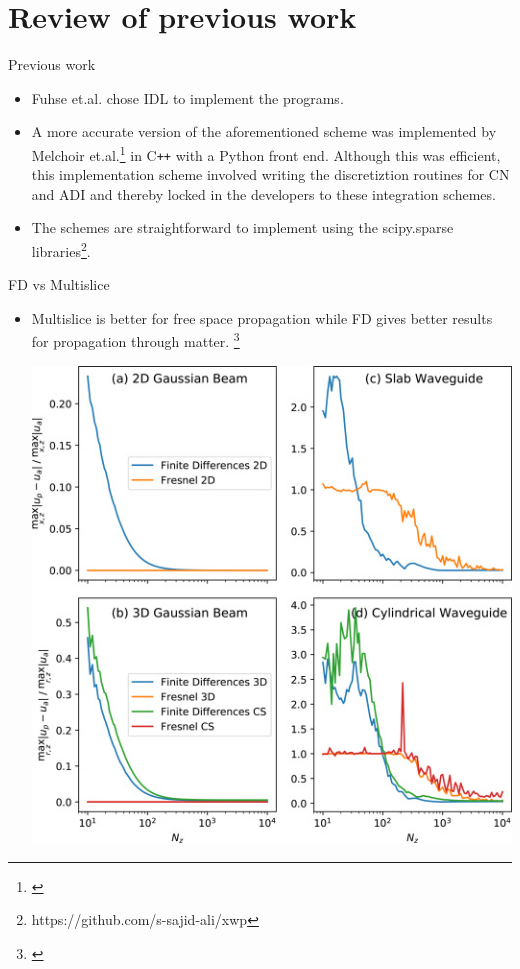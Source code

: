 \documentclass{beamer}
\begin{document}
\section{Review of previous work}
\begin{frame}{Previous work}
\begin{itemize}
	\item Fuhse et.al. chose IDL to implement the programs. 
	\item A more accurate version of the aforementioned scheme was implemented by Melchoir et.al.\footnote{\cite{Melchior17}} in C\texttt{++} with a Python front end. Although this was efficient, this implementation scheme involved writing the discretiztion routines for CN and ADI and thereby locked in the developers to these integration schemes.
	\item The schemes are straightforward to implement using the scipy.sparse libraries\footnote{https://github.com/s-sajid-ali/xwp}.
\end{itemize}
\end{frame}
	
\begin{frame}{FD vs Multislice}
\begin{itemize}
\item Multislice is better for free space propagation while FD gives better results for propagation through matter. \footnote{\cite{Melchior17}\cite{Scarmozzino91}}
\begin{center}
	\includegraphics[scale=1.9]{fdms}
\end{center}
\end{itemize}
\end{frame}
\end{document}
